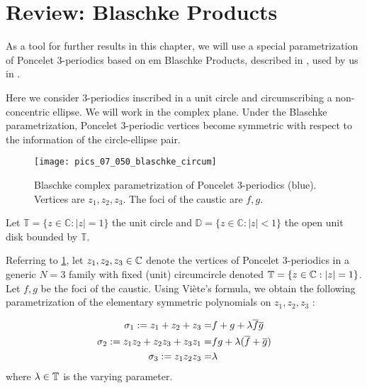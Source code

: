 \section{Review: Blaschke Products}
\label{sec:07-blaschke}

As a tool for further results in this chapter, we will use a special parametrization of Poncelet 3-periodics based on {em Blaschke Products}, described in \cite{daepp-2019}, used by us in  \cite{helman2021-power-loci}.

Here we consider 3-periodics inscribed in a unit circle and circumscribing a non-concentric ellipse. We will work in the complex plane. Under the Blaschke parametrization, Poncelet 3-periodic vertices become symmetric with respect to the information of the circle-ellipse pair.

\begin{figure}
    \centering
    \texttt{[image: pics\_07\_050\_blaschke\_circum]}
    \caption{Blaschke complex parametrization of Poncelet 3-periodics (blue). Vertices are $z_1,z_2,z_3$. The foci of the caustic are $f,g$. }
    \label{fig:07-blaschke}
\end{figure}


Let  $\mathbb{T } = \{ z\in \mathbb{C}: |z| = 1\} $ the unit circle and $\mathbb{D} = \{ z\in\mathbb{C} : |z| < 1\} $ the open unit disk
bounded by $\mathbb{T }.$

Referring to \cref{fig:07-blaschke}, let $z_1,z_2,z_3\in\mathbb{C}$ denote the vertices of Poncelet 3-periodics in a generic $N=3$ family with fixed (unit) circumcircle denoted $\mathbb{T}=\{z\in\mathbb{C} : |z|=1\}$. Let $f,g$ be the foci of the caustic. Using Viète's formula, we obtain the following parametrization of the elementary symmetric polynomials on $z_1,z_2,z_3$ \cite{daepp-2019}:

\begin{definition}
\begin{align*}
    \sigma_1:=z_1+z_2+z_3=& f+g+\lambda\overline f \overline g \\
    \sigma_2:=z_1 z_2+z_2 z_3+z_3 z_1=& f g+\lambda(\overline f+\overline g) \\
    \sigma_3:=z_1 z_2 z_3=& \lambda
\end{align*}
where $\lambda\in\mathbb{T}$ is the varying parameter.
\label{def:bla}
\end{definition}

